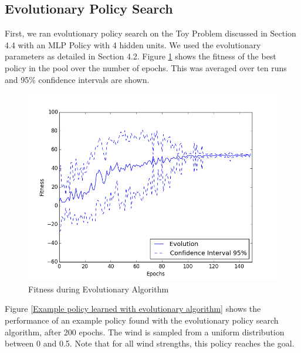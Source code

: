 \subsection{Evolutionary Policy Search}

First, we ran evolutionary policy search on the Toy Problem discussed in Section 4.4 with an MLP Policy with 4 hidden units. We used the evolutionary parameters as detailed in Section 4.2. Figure \ref{Fitness during Evolutionary Algorithm} shows the fitness of the best policy in the pool over the number of epochs. This was averaged over ten runs and 95\% confidence intervals are shown. 

\begin{figure}[ht]
  \centering
  \includegraphics[scale=0.5]{images/evo.png}
  \caption{Fitness during Evolutionary Algorithm}\label{Fitness during Evolutionary Algorithm}
\end{figure}

Figure \ref{Example policy learned with evolutionary algorithm} shows the performance of an example policy found with the evolutionary policy search algorithm, after 200 epochs. The wind is sampled from a uniform distribution between 0 and 0.5. Note that for all wind strengths, this policy reaches the goal. 

